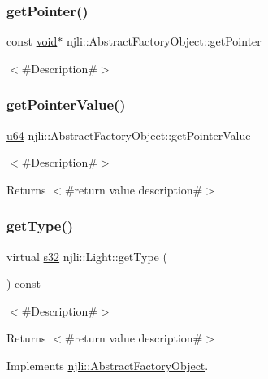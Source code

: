 \subsubsection{\texorpdfstring{get\+Pointer()}{getPointer()}}
{\footnotesize\ttfamily const \mbox{\hyperlink{_thread_8h_af1e856da2e658414cb2456cb6f7ebc66}{void}}$\ast$ njli\+::\+Abstract\+Factory\+Object\+::get\+Pointer}

$<$\#\+Description\#$>$ \mbox{\label{classnjli_1_1_light_a4ffddf141a426a5a07d0ac19f1913811}} 
\subsubsection{\texorpdfstring{get\+Pointer\+Value()}{getPointerValue()}}
{\footnotesize\ttfamily \mbox{\hyperlink{_util_8h_ad758b7a5c3f18ed79d2fcd23d9f16357}{u64}} njli\+::\+Abstract\+Factory\+Object\+::get\+Pointer\+Value}

$<$\#\+Description\#$>$

\begin{DoxyReturn}{Returns}
$<$\#return value description\#$>$ 
\end{DoxyReturn}
\mbox{\label{classnjli_1_1_light_a06755694d3359c31bd95e121f7dec871}} 
\subsubsection{\texorpdfstring{get\+Type()}{getType()}}
{\footnotesize\ttfamily virtual \mbox{\hyperlink{_util_8h_aa62c75d314a0d1f37f79c4b73b2292e2}{s32}} njli\+::\+Light\+::get\+Type (\begin{DoxyParamCaption}{ }\end{DoxyParamCaption}) const\hspace{0.3cm}{\ttfamily [virtual]}}

$<$\#\+Description\#$>$

\begin{DoxyReturn}{Returns}
$<$\#return value description\#$>$ 
\end{DoxyReturn}


Implements \mbox{\hyperlink{classnjli_1_1_abstract_factory_object_a207c86146d40d0794708ae7f2d4e60a7}{njli\+::\+Abstract\+Factory\+Object}}.

